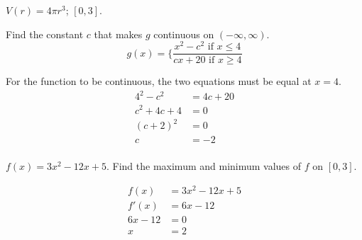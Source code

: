 \documentclass[fleqn,addpoints]{exam}
\begin{document}
\begin{questions}
\begin{solution}
\end{solution}

\question $V(r) = 4 \pi r^3$; $[0, 3]$.

\ifprintanswers
\pagebreak
\fi

\question Find the constant $c$ that makes $g$ continuous on $(-\infty, \infty)$.
\[
  g(x) = \bigg\{ \frac{x^2 - c^2 \text{ if } x \leq 4}{cx + 20 \text{ if } x \geq 4}
\]

\begin{solution}
For the function to be continuous, the two equations must be equal at $x = 4$.
\begin{align*}
  4^2 - c^2 &= 4c + 20 \\
  c^2 + 4c + 4 &= 0 \\
  (c + 2)^2 &= 0 \\
  c &= -2 \\
\end{align*}

\end{solution}

\question $f(x) = 3x^2 - 12x + 5$.  Find the maximum and minimum values of $f$ on $[0, 3]$.
\begin{solution}
\begin{align*}
  f(x) &= 3x^2 - 12x + 5 \\
  f'(x) &= 6x - 12 \\
  6x - 12 &= 0 \\
  x &= 2 \\
\end{align*}


\end{solution}
\end{questions}
\end{document}
